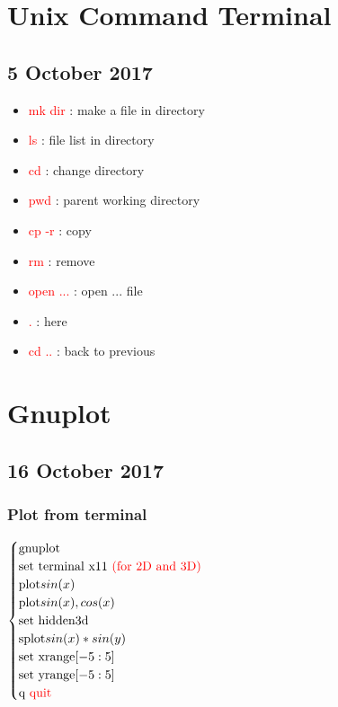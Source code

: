 \documentclass[a4paper,10pt]{article}
\begin{document}
	
\section{Unix Command Terminal}

\subsection{5 October 2017}
\begin{itemize}
	\item \textcolor{red}{mk dir} : make a file in directory
	\item \textcolor{red}{ls} : file list in directory
	\item \textcolor{red}{cd} : change directory
	\item \textcolor{red}{pwd} : parent working directory
	\item \textcolor{red}{cp -r} : copy
	\item \textcolor{red}{rm} : remove
	\item \textcolor{red}{open ...} : open ... file
	\item \textcolor{red}{.} : here
	\item \textcolor{red}{cd ..} : back to previous
\end{itemize}

\section{Gnuplot}

\subsection{16 October 2017}
\subsubsection{Plot from terminal}
$ \begin{cases}
	\text{gnuplot} \\
	\text{set terminal x11 \textcolor{red}{(for 2D and 3D)}} \\
	\text{plot} sin(x) \\
	\text{plot} sin(x), cos(x) \\
	\text{set hidden3d} \\
	\text{splot} sin(x)*sin(y) \\
	\text{set xrange}[-5:5] \\
	\text{set yrange}[-5:5] \\
	\text{q \textcolor{red}{quit}}	
\end{cases} $
\end{document}
